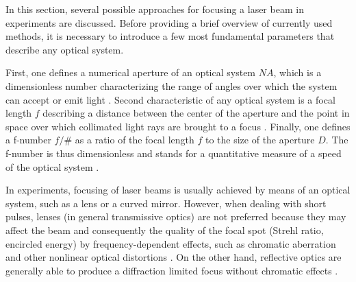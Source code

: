 In this section, several possible approaches for focusing a laser beam in experiments are discussed. Before providing a brief overview of currently used methods, it is necessary to introduce a few most fundamental parameters that describe any optical system.

First, one defines a numerical aperture of an optical system $ N\!A $, which is a dimensionless number characterizing the range of angles over which the system can accept or emit light \cite{Greivenkamp2004}. Second characteristic of any optical system is a focal length $ f $ describing a distance between the center of the aperture and the point in space over which collimated light rays are brought to a focus \cite{Greivenkamp2004}. Finally, one defines a f-number $ f/\# $ as a ratio of the focal length $ f $ to the size of the aperture $ D $. The f-number is thus dimensionless and stands for a quantitative measure of a speed of the optical system \cite{Smith2007}.

In experiments, focusing of laser beams is usually achieved by means of an optical system, such as a lens or a curved mirror. However, when dealing with short pulses, lenses (in general transmissive optics) are not preferred because they may affect the beam and consequently the quality of the focal spot (Strehl ratio, encircled energy) by frequency-dependent effects, such as chromatic aberration and other nonlinear optical distortions \cite{Sjoegren2002}. On the other hand, reflective optics are generally able to produce a diffraction limited focus without chromatic effects \cite{Marimont1994}.